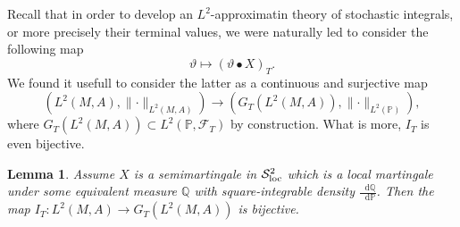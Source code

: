 \documentclass[11pt,a4paper,twoside,openany]{report}
\newcommand{\diff}{\mathop{}\!\mathrm{d}}
\theoremstyle{plain} %
\newtheorem{lemma}[lemma]{Lemma}
\theoremstyle{definition} %
\theoremstyle{remark} %
\begin{document}
\bigbreak 
Recall that in order to develop an \(L^2\)-approximatin theory of stochastic integrals, or more precisely their terminal values, we were naturally led to consider the following map 
\begin{equation}
    \vartheta\mapsto (\vartheta\bullet X)_{T}.
\end{equation}
We found it usefull to consider the latter as a continuous and surjective map
\begin{equation}
(L^2(M,A),\lVert\cdot\rVert_{L^2(M,A)})\to(G_T(L^2(M,A)),\lVert\cdot\rVert_{L^2(\mathbb{P})}),
\end{equation}
where \(G_T(L^2(M,A))\subset L^2(\mathbb{P},\mathcal{F}_{T})\) by construction.  
What is more, \(I_{T}\) is even bijective.
\begin{lemma}\label{lemma:integral map is bijective}
    Assume \(X\) is a semimartingale in \(\mathcal{S}^2_{\rm{loc}}\) which is a local martingale under some equivalent measure \(\mathbb{Q}\) with square-integrable density \(\frac{\diff \mathbb{Q}}{\diff \mathbb{P}}\). Then the map \(I_{T}:L^2(M,A)\to G_T(L^2(M,A))\) is bijective.
\end{lemma}
\end{document}
